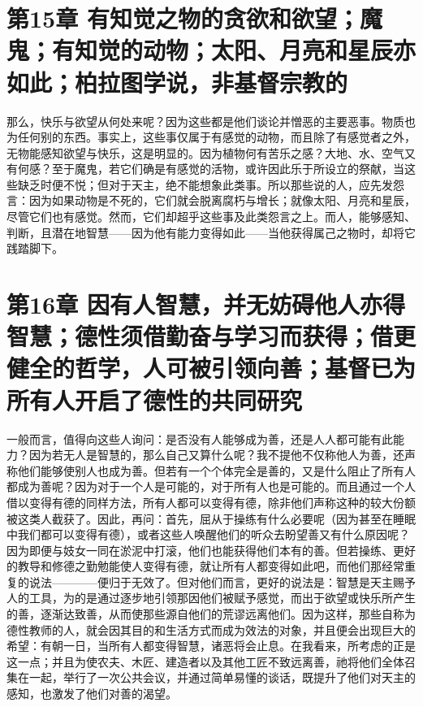 
\section{第15章 有知觉之物的贪欲和欲望；魔鬼；有知觉的动物；太阳、月亮和星辰亦如此；柏拉图学说，非基督宗教的}

那么，快乐与欲望从何处来呢？因为这些都是他们谈论并憎恶的主要恶事。物质也为任何别的东西。事实上，这些事仅属于有感觉的动物，而且除了有感觉者之外，无物能感知欲望与快乐，这是明显的。因为植物何有苦乐之感？大地、水、空气又有何感？至于魔鬼，若它们确是有感觉的活物，或许因此乐于所设立的祭献，当这些缺乏时便不悦；但对于天主，绝不能想象此类事。所以那些说的人，应先发怨言：因为如果动物是不死的，它们就会脱离腐朽与增长；就像太阳、月亮和星辰，尽管它们也有感觉。然而，它们却超乎这些事及此类怨言之上。而人，能够感知、判断，且潜在地智慧——因为他有能力变得如此——当他获得属己之物时，却将它践踏脚下。\par


\section{第16章 因有人智慧，并无妨碍他人亦得智慧；德性须借勤奋与学习而获得；借更健全的哲学，人可被引领向善；基督已为所有人开启了德性的共同研究}

一般而言，值得向这些人询问：是否没有人能够成为善，还是人人都可能有此能力？因为若无人是智慧的，那么自己又算什么呢？我不提他不仅称他人为善，还声称他们能够使别人也成为善。但若有一个个体完全是善的，又是什么阻止了所有人都成为善呢？因为对于一个人是可能的，对于所有人也是可能的。而且通过一个人借以变得有德的同样方法，所有人都可以变得有德，除非他们声称这种的较大份额被这类人截获了。因此，再问：首先，屈从于操练有什么必要呢（因为甚至在睡眠中我们都可以变得有德），或者这些人唤醒他们的听众去盼望善又有什么原因呢？因为即便与妓女一同在淤泥中打滚，他们也能获得他们本有的善。但若操练、更好的教导和修德之勤勉能使人变得有德，就让所有人都变得如此吧，而他们那经常重复的说法————便归于无效了。但对他们而言，更好的说法是：智慧是天主赐予人的工具，为的是通过逐步地引领那因他们被赋予感觉，而出于欲望或快乐所产生的善，逐渐达致善，从而使那些源自他们的荒谬远离他们。因为这样，那些自称为德性教师的人，就会因其目的和生活方式而成为效法的对象，并且便会出现巨大的希望：有朝一日，当所有人都变得智慧，诸恶将会止息。在我看来，所考虑的正是这一点；并且为使农夫、木匠、建造者以及其他工匠不致远离善，祂将他们全体召集在一起，举行了一次公共会议，并通过简单易懂的谈话，既提升了他们对天主的感知，也激发了他们对善的渴望。\par

